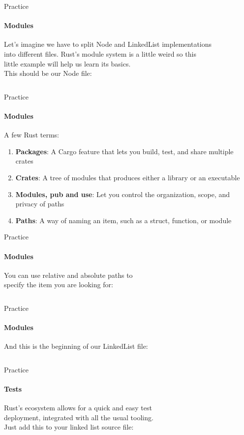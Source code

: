 \documentclass[usenames,dvipsnames,10pt,aspectratio=169]{beamer}
\begin{document}
\begin{frame}{Practice}
	\framesubtitle{Modules}	
	Let's imagine we have to split Node and LinkedList implementations\\
	into different files. Rust's module system is a little weird so this\\
	little example will help us learn its basics.\\

	\vspace{0.3cm}
	This should be our Node file:
	\vspace{0.3cm}
	\inputminted[fontsize=\normalsize]{rust}{code/list10.rs}
\end{frame}

\begin{frame}{Practice}
	\framesubtitle{Modules}	
	\large
	A few Rust terms:
	\begin{enumerate}
		\item \textbf{Packages}: A Cargo feature that lets
			you build, test, and share multiple crates
		\item \textbf{Crates}: A tree of modules that 
			produces either a library or an executable
		\item \textbf{Modules, pub and use}: Let you control the organization, scope, and privacy of paths
		\item \textbf{Paths}: A way of naming an item, such as a struct, function, or module
	\end{enumerate}
\end{frame}

\begin{frame}{Practice}
	\framesubtitle{Modules}
	\large
	You can use relative and absolute paths to\\
	specify the item you are looking for:\\
	\vspace{0.1cm}
	\inputminted[fontsize=\normalsize]{rust}{code/modules.rs}
\end{frame}

\begin{frame}{Practice}
	\framesubtitle{Modules}
	\large
	And this is the beginning of our LinkedList file:
	\vspace{0.3cm}
	\inputminted[fontsize=\large]{rust}{code/list11.rs}
\end{frame}

\begin{frame}{Practice}
	\framesubtitle{Tests}
	\large
	Rust's ecosystem allows for a quick and easy test\\
	deployment, integrated with all the usual tooling.\\
	Just add this to your linked list source file:\\
	\vspace{0.2cm}
	\inputminted[fontsize=\normalsize]{rust}{code/list12.rs}
	\vspace{0.3cm}
\end{frame}
\end{document}
